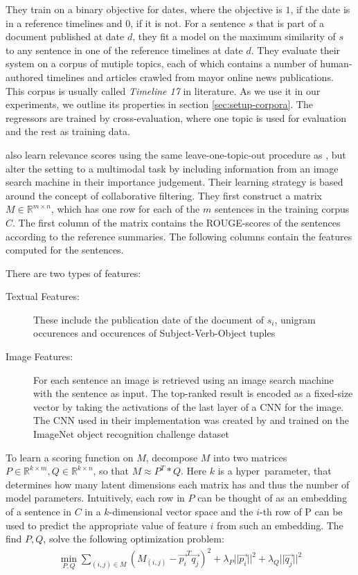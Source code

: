 \documentclass[a4paper,BCOR=10mm]{report}
\numberwithin{lemma}{chapter}
\numberwithin{definition}{chapter}
\begin{document}
They train on a binary objective for dates, where the objective is $1$, if the date is in a reference timelines and $0$, if it is not.
For a sentence $s$ that is part of a document published at date $d$, they fit a model on the maximum similarity of $s$ to any sentence in one of the reference timelines at date $d$.
They evaluate their system on a corpus of mutiple topics, each of which contains a number of human-authored timelines and articles crawled from mayor online news publications. This corpus is usually called \textit{Timeline 17} in literature. As we use it in our experiments, we outline its properties in section \ref{sec:setup-corpora}. The regressors are trained by cross-evaluation, where one topic is used for evaluation and the rest as training data.

\citet{multimodal} also learn relevance scores using the same leave-one-topic-out procedure as \citet{tran-headlines}, but alter the setting to a multimodal task by including information from an image search machine in their importance judgement.
Their learning strategy is based around the concept of collaborative filtering.
They first construct a matrix $M \in \mathbb{R}^{m \times n}$, which has one row for each of the $m$ sentences in the training corpus $C$. The first column of the matrix contains the ROUGE-scores of the sentences according to the reference summaries. The following columns contain the features computed for the sentences.

There are two types of features:

\begin{description}
\item[Textual Features:]{These include the publication date of the document of $s_i$, unigram occurences and occurences of Subject-Verb-Object tuples}
\item[Image Features:]{For each sentence an image is retrieved using an image search machine with the sentence as input. The top-ranked result is encoded as a fixed-size vector by taking the activations of the last layer of a CNN for the image. The CNN used in their implementation was created by \citet{Simonyan+Zisserman} and trained on the ImageNet \citep{ImageNet} object recognition challenge dataset}
\end{description}

To learn a scoring function on $M$, \citet{multimodal} decompose $M$ into two matrices $P \in \mathbb{R}^{k \times m}, Q \in \mathbb{R}^{k \times n}$, so that $M \approx P^T * Q$. Here $k$ is a hyper~parameter, that determines how many latent dimensions each matrix has and thus the number of model parameters. Intuitively, each row in $P$ can be thought of as an embedding of a sentence in $C$ in a $k$-dimensional vector space and the $i$-th row of P can be used to predict the appropriate value of feature $i$ from such an embedding.
The find $P, Q$, \citeauthor{multimodal} solve the following optimization problem:
\begin{align}
\min_{P, Q} \sum_{(i,j) \in M} (M_{(i,j)} - \vec{p_i}^T\vec{q_j})^2 + \lambda_P ||\vec{p_i}|| ^ 2 + \lambda_Q ||\vec{q_j}|| ^ 2 \label{multimodal-objective}
\end{align}
\end{document}
